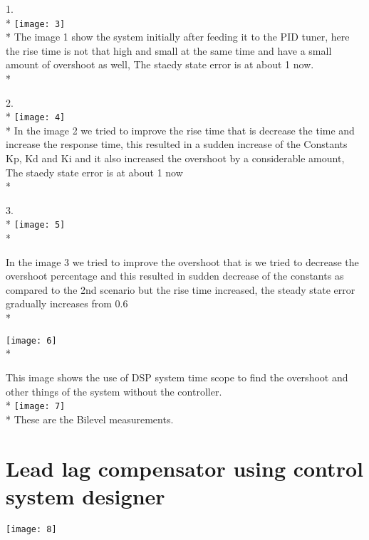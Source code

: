 \documentclass{article}
\begin{document}
1.\\*
\texttt{[image: 3]}\\*
The image 1 show the system initially after feeding it to the PID tuner, here the rise time is not that high and small at the same time and have a small amount of overshoot as well, The staedy state error is at about 1 now.\\*

2.\\*
\texttt{[image: 4]}\\*
In the image 2 we tried to improve the rise time that is decrease the time and increase the response time, this resulted in a sudden increase of the Constants Kp, Kd and Ki and it also increased the overshoot by a considerable amount, The staedy state error is at about 1 now\\*

3.\\*
\texttt{[image: 5]}\\*

In the image 3 we tried to improve the overshoot that is we tried to decrease the overshoot percentage and this resulted in sudden decrease of the constants as compared to the 2nd scenario but the rise time increased, the steady state error gradually increases from 0.6\\*

\texttt{[image: 6]}\\*

This image shows the use of DSP system time scope to find the overshoot and other things of the system without the controller.\\*
\texttt{[image: 7]}\\*
These are the Bilevel measurements.
\section{Lead lag compensator using control system designer}
\texttt{[image: 8]}
\end{document}
